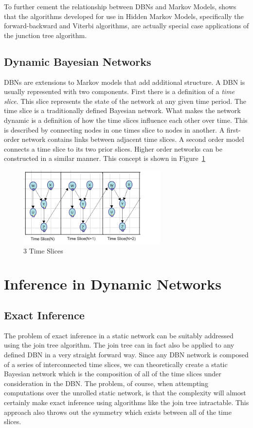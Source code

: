 \documentclass{article}
\begin{document}
To further cement the relationship between DBNs and Markov Models, \cite{smyth96probabilistic} shows that the algorithms developed for use in Hidden Markov Models, specifically the forward-backward and Viterbi algorithms, are actually special case applications of the junction tree algorithm. 

\subsection{Dynamic Bayesian Networks}
DBNs are extensions to Markov models that add additional structure. A DBN is usually represented with two components. First there is a definition of a \emph{time slice}. This slice represents the state of the network at any given time period. The time slice is a traditionally defined Bayesian network. What makes the network dynamic is a definition of how the time slices influence each other over time. This is described by connecting nodes in one times slice to nodes in another. A first-order network contains links between adjacent time slices. A second order model connects a time slice to its two prior slices. Higher order networks can be constructed in a similar manner. This concept is shown in Figure~\ref{fig:timeslice} 

\begin{figure}[h]
\begin{center}
\includegraphics[height=40mm]{figures/timeslice.png}
\caption{3 Time Slices}
\label{fig:timeslice}
\end{center}
\end{figure}

\section{Inference in Dynamic Networks}
\subsection{Exact Inference}
The problem of exact inference in a static network can be suitably addressed using the join tree algorithm. The join tree can in fact also be applied to any defined DBN in a very straight forward way. Since any DBN network is composed of a series of interconnected time slices, we can theoretically create a static Bayesian network which is the composition of all of the time slices under consideration in the DBN. The problem, of course, when attempting computations over the unrolled static network, is that the complexity will almost certainly make exact inference using algorithms like the join tree intractable. This approach also throws out the symmetry which exists between all of the time slices.
\end{document}
